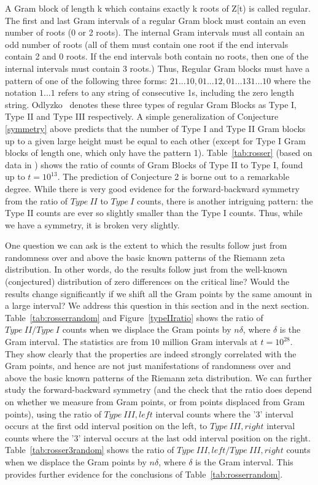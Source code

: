 \documentclass[twoside]{article}
\begin{document}
A Gram block of length k which contains exactly k roots of Z[t) is called regular. The first and last Gram intervals of a regular Gram block must contain an even number of roots (0 or 2 roots). The internal Gram intervals must all contain an odd number of roots (all of them must contain one root if the end intervals contain 2 and 0 roots. If the end intervals both contain no roots, then one of the internal intervals must contain 3 roots.) 
Thus, Regular Gram blocks must have a pattern of one of the following three forms:
$21 . . . 10, 01 . . . 12, 01 . . . 131 . . . 10$
where the notation $1 . . . 1$ refers to any string of consecutive 1s, including the zero length string. Odlyzko~\cite{Odlyzko(1992)} denotes these three types of regular Gram Blocks as Type I, Type II and Type III respectively. A simple generalization of Conjecture \ref{symmetry} above predicts that the number of Type I and Type II Gram blocks up to a given large height must be equal to each other (except for Type I Gram blocks of length one, which only have the pattern 1).  Table~\ref{tab:rosser}  (based on data in \cite{gourdon}) shows the ratio of counts of Gram Blocks of Type II to Type I, found up to $t = 10^{13}$. The prediction of Conjecture 2 is borne out to a remarkable degree. While there is very good evidence for the forward-backward symmetry from the ratio of $Type~II$ to $Type~I$ counts, there is another intriguing pattern: the Type II counts are ever so slightly smaller than the Type I counts. Thus, while we have a symmetry, it is broken very slightly.

One question we can ask is the extent to which the results follow just from randomness over and above the basic known patterns of the Riemann zeta distribution. In other words, do the results follow just from the well-known (conjectured) distribution of zero differences on the critical line? Would the results change significantly if we shift all the Gram points  by the same amount in a large interval? We address this question in this section and in  the next section. Table~\ref{tab:rosserrandom} and Figure~\ref{typeIIratio} shows the ratio of $Type~II/Type~I$ counts when we displace the Gram points by $n\delta$, where $\delta$ is the Gram interval. The statistics are from $10$ million Gram intervals at $t=10^{28}$.
They  show clearly that the properties are indeed strongly correlated with the Gram points, and hence are not just manifestations of randomness over and above the basic known patterns of the Riemann zeta distribution. 
We can further study the forward-backward symmetry (and the check that the ratio does depend on whether we measure from Gram points, or from points displaced from Gram points), using the ratio of  $Type~III,left$ interval counts where the '3' interval occurs at the first odd interval position on the left, to  $Type~III,right$ interval counts where the '3' interval occurs at the last odd interval position on the right. 
Table~\ref{tab:rosser3random} shows the ratio of $Type~III,left/Type~III,right$ counts when we displace the Gram points by $n\delta$, where $\delta$ is the Gram interval. This provides further evidence for the conclusions of Table~\ref{tab:rosserrandom}.
\end{document}
